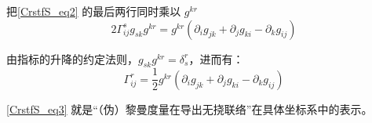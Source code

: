 把\autoref{CrstfS_eq2} 的最后两行同时乘以 $g^{kr}$
\begin{equation}
2\Gamma^{s}_{ij}g_{sk}g^{kr}=g^{kr}(\partial_ig_{jk}+\partial_jg_{ki}-\partial_kg_{ij})
\end{equation}

由指标的升降的约定法则，$g_{sk}g^{kr}=\delta_s^r$，进而有：
\begin{equation}\label{CrstfS_eq3}
\Gamma^{r}_{ij}=\frac{1}{2}g^{kr}(\partial_ig_{jk}+\partial_jg_{ki}-\partial_kg_{ij})
\end{equation}

\autoref{CrstfS_eq3} 就是“（伪）黎曼度量在导出无挠联络”在具体坐标系中的表示。






